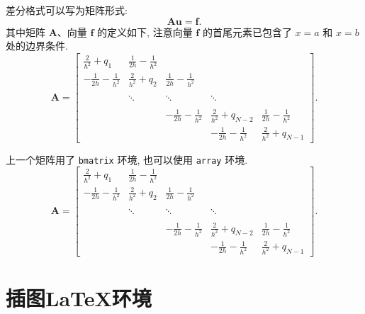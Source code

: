 \documentclass[UTF8,openany]{ctexbook}
\numberwithin{equation}{chapter}
\numberwithin{figure}{chapter}
\numberwithin{table}{chapter}
\theoremstyle{mystyle}
\begin{document}
差分格式可以写为矩阵形式:
\begin{equation*}
  \boldsymbol{A}\boldsymbol{u}=\boldsymbol{f}.
\end{equation*}
其中矩阵 $\boldsymbol{A}$、向量 $\boldsymbol{f}$ 的定义如下, 注意向量 $\boldsymbol{f}$ 的首尾元素已包含了 $x=a$ 和 $x=b$ 处的边界条件.
\begin{equation}\label{eq:matrix1}
\boldsymbol{A}=\begin{bmatrix}
\frac{2}{h^{2}}+q_{1} & \frac{1}{2h}-\frac{1}{h^{2}} &   &  &  \\[8pt]
 -\frac{1}{2h}-\frac{1}{h^{2}} & \frac{2}{h^{2}}+q_{2} & \frac{1}{2h}-\frac{1}{h^{2}}  & &  \\[8pt]
  &  &  &  &    \\
  &  \ddots  & \ddots  &  \ddots  &  \\[8pt]
  &  &  &  &    \\
  &   & -\frac{1}{2h}-\frac{1}{h^{2}} & \frac{2}{h^{2}}+q_{N-2}& \frac{1}{2h}-\frac{1}{h^{2}} \\[8pt]
  &  &  & -\frac{1}{2h}-\frac{1}{h^{2}} & \frac{2}{h^{2}}+q_{N-1}
\end{bmatrix}.
\end{equation}

\clearpage
上一个矩阵用了 \verb|bmatrix| 环境, 也可以使用 \verb|array| 环境.
\begin{equation}\label{eq:matrix2}
\boldsymbol{A}=\left[\begin{array}{cccccc}
\frac{2}{h^{2}}+q_{1} & \frac{1}{2h}-\frac{1}{h^{2}} &  &  &  \\[8pt]
 -\frac{1}{2h}-\frac{1}{h^{2}} & \frac{2}{h^{2}}+q_{2} & \frac{1}{2h}-\frac{1}{h^{2}}  & &  \\[8pt]
  &  &  &  &   \\
  &  \ddots  & \ddots & \ddots &  \\[8pt]
  &  &  &  &   \\
  &   & -\frac{1}{2h}-\frac{1}{h^{2}} & \frac{2}{h^{2}}+q_{N-2} & \frac{1}{2h}-\frac{1}{h^{2}} \\[8pt]
  &  &  & -\frac{1}{2h}-\frac{1}{h^{2}} & \frac{2}{h^{2}}+q_{N-1}
\end{array}\right].
\end{equation}



\chapter{插图LaTeX环境}
\end{document}
